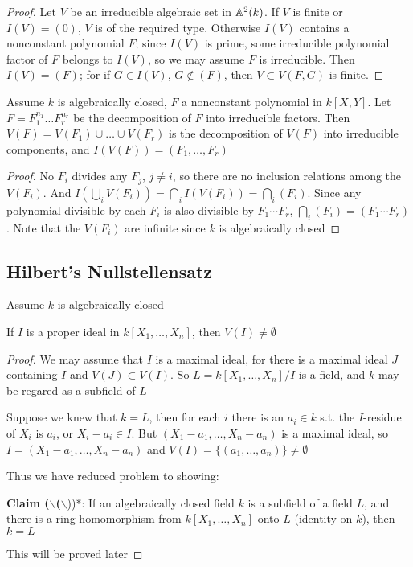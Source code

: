 \documentclass[11pt]{article}
\begin{document}
\begin{proof}
Let \(V\) be an irreducible algebraic set in \(\mathbb{A}^2(k)\). If \(V\) is finite
or \(I(V)=(0)\), \(V\) is of the required type. Otherwise \(I(V)\) contains a nonconstant
polynomial \(F\); since \(I(V)\) is prime, some irreducible polynomial factor of \(F\) belongs
to \(I(V)\), so we may assume \(F\) is irreducible. Then \(I(V)=(F)\); for
if \(G\in I(V)\), \(G\notin(F)\), then \(V\subset V(F,G)\) is finite.
\end{proof}

\begin{corollary}[]
Assume \(k\) is algebraically closed, \(F\) a nonconstant polynomial in \(k[X,Y]\).
Let \(F=F_1^{n_1}\dots F_r^{n_r}\) be the decomposition of \(F\) into irreducible factors.
Then \(V(F)=V(F_1)\cup\dots\cup V(F_r)\) is the decomposition of \(V(F)\) into irreducible components,
and \(I(V(F))=(F_1,\dots,F_r)\)
\end{corollary}

\begin{proof}
No \(F_i\) divides any \(F_j\), \(j\neq i\), so there are no inclusion relations among
the \(V(F_i)\). And \(I(\bigcup_iV(F_i))=\bigcap_iI(V(F_i))=\bigcap_i(F_i)\). Since any polynomial divisible by
each \(F_i\) is also divisible by \(F_1\cdots F_r\), \(\bigcap_i(F_i)=(F_1\cdots F_r)\). Note that the \(V(F_i)\) are
infinite since \(k\) is algebraically closed
\end{proof}
\subsection{Hilbert's Nullstellensatz}
\label{sec:orgb811f17}
Assume \(k\) is algebraically closed

\begin{theorem}
If \(I\) is a proper ideal in \(k[X_1,\dots,X_n]\), then \(V(I)\neq\emptyset\)
\end{theorem}

\begin{proof}
We may assume that \(I\) is a maximal ideal, for there is a maximal ideal \(J\) containing \(I\)
and \(V(J)\subset V(I)\). So \(L=k[X_1,\dots,X_n]/I\) is a field, and \(k\) may be regared as a subfield
of \(L\)

Suppose we knew that \(k=L\), then for each \(i\) there is an \(a_i\in k\) s.t. the \(I\)-residue
of \(X_i\) is \(a_i\), or \(X_i-a_i\in I\). But \((X_1-a_1,\dots,X_n-a_n)\) is a maximal ideal,
so \(I=(X_1-a_1,\dots,X_n-a_n)\) and \(V(I)=\{(a_1,\dots,a_n)\}\neq\emptyset\)

Thus we have reduced problem to showing:

\textbf{Claim ($\backslash$(}$\backslash$))*: If an algebraically closed field \(k\) is a subfield of a field \(L\), and there is a
 ring homomorphism from \(k[X_1,\dots,X_n]\) onto \(L\) (identity on \(k\)), then \(k=L\)

This will be proved later
\end{proof}
\end{document}
